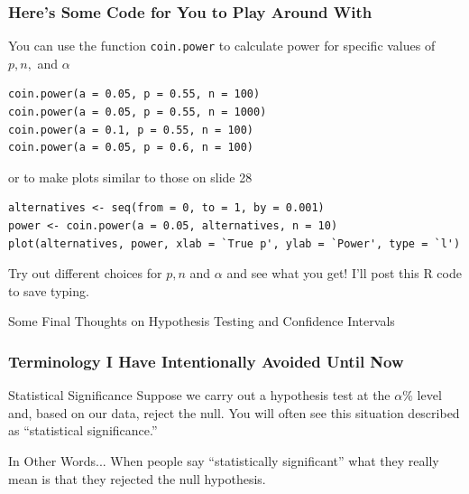 \documentclass[handout]{beamer}
\begin{document}

\begin{frame}[fragile]
\frametitle{Here's Some Code for You to Play Around With}
\footnotesize
You can use the function \texttt{coin.power} to calculate power for specific values of $p, n,$ and $\alpha$
\begin{verbatim}
coin.power(a = 0.05, p = 0.55, n = 100)
coin.power(a = 0.05, p = 0.55, n = 1000)
coin.power(a = 0.1, p = 0.55, n = 100)
coin.power(a = 0.05, p = 0.6, n = 100)
\end{verbatim}
or to make plots similar to those on slide 28
\begin{verbatim}
alternatives <- seq(from = 0, to = 1, by = 0.001)
power <- coin.power(a = 0.05, alternatives, n = 10)
plot(alternatives, power, xlab = `True p', ylab = `Power', type = `l')
\end{verbatim}
Try out different choices for $p,n$ and $\alpha$ and see what you get! I'll post this R code to save typing.

\end{frame}



\begin{frame}
\begin{center}
	\huge Some Final Thoughts on Hypothesis Testing and Confidence Intervals
\end{center}
\end{frame}
\begin{frame}
\frametitle{Terminology I Have Intentionally Avoided Until Now}

\begin{block}{Statistical Significance}
Suppose we carry out a hypothesis test at the $\alpha\%$ level and,  based on our data, reject the null. You will often see this situation described as ``statistical significance.''
\end{block}

\begin{block}{In Other Words...}
When people say ``statistically significant'' what they really mean is that they rejected the null hypothesis.
\end{block}
\end{frame}
\end{document}
